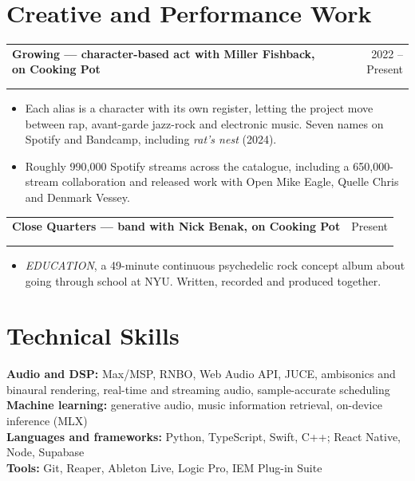 \documentclass[10pt,letterpaper]{article}
\makeatletter
\newcommand{\entry}[4]{%
  \begin{tabularx}{\textwidth}{@{}X@{\hspace{8pt}}r@{}}
    \textbf{#1} & #2 \\
    \ifx\relax#3\relax\else \textit{#3} & \textit{#4} \\ \fi
  \end{tabularx}\vspace{1pt}}
\makeatother
\begin{document}
\section{Creative and Performance Work}
\entry{Growing --- character-based act with Miller Fishback, on Cooking Pot}{2022 -- Present}{}{}
\begin{itemize}
  \item Each alias is a character with its own register, letting the project move between rap, avant-garde
  jazz-rock and electronic music. Seven names on Spotify and Bandcamp, including \textit{rat's nest} (2024).
  \item Roughly 990,000 Spotify streams across the catalogue, including a 650,000-stream collaboration and
  released work with Open Mike Eagle, Quelle Chris and Denmark Vessey.
\end{itemize}
\entry{Close Quarters --- band with Nick Benak, on Cooking Pot}{Present}{}{}
\begin{itemize}
  \item \textit{EDUCATION}, a 49-minute continuous psychedelic rock concept album about going through school at
  NYU. Written, recorded and produced together.
\end{itemize}

\section{Technical Skills}
\textbf{Audio and DSP:} Max/MSP, RNBO, Web Audio API, JUCE, ambisonics and binaural rendering,
real-time and streaming audio, sample-accurate scheduling\\
\textbf{Machine learning:} generative audio, music information retrieval, on-device inference (MLX)\\
\textbf{Languages and frameworks:} Python, TypeScript, Swift, C++; React Native, Node, Supabase\\
\textbf{Tools:} Git, Reaper, Ableton Live, Logic Pro, IEM Plug-in Suite
\end{document}
